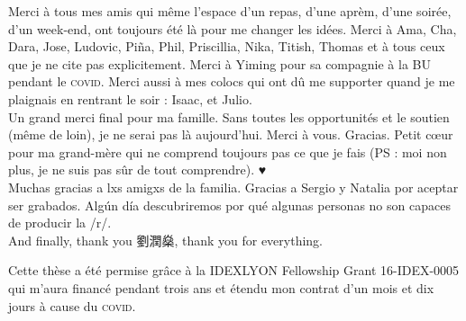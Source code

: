 Merci à tous mes amis qui même l'espace d'un repas, d'une aprèm, d'une soirée, d'un week-end, ont toujours été là pour me changer les idées. Merci à Ama, Cha, Dara, Jose, Ludovic, Piña, Phil, Priscillia, Nika, Titish, Thomas et à tous ceux que je ne cite pas explicitement.  Merci à Yiming pour sa compagnie à la BU pendant le \textsc{covid}. Merci aussi à mes colocs qui ont dû me supporter quand je me plaignais en rentrant le soir : Isaac, et Julio.\\

Un grand merci final pour ma famille. Sans toutes les opportunités et le soutien (même de loin), je ne serai pas là aujourd'hui. Merci à vous. Gracias. Petit cœur pour ma grand-mère qui ne comprend toujours pas ce que je fais (PS : moi non plus, je ne suis pas sûr de tout comprendre). ♥\\
Muchas gracias a lxs amigxs de la familia. Gracias a Sergio y Natalia por aceptar ser grabados. Algún día descubriremos por qué algunas personas no son capaces de producir la /r/.\\

\enlargethispage{2\baselineskip}
And finally, thank you {\cjkfont 劉潤燊}, thank you for everything.
\newpage

\hspace{0pt}
\vfill
\begin{flushright}
Cette thèse a été permise grâce à la IDEXLYON Fellowship Grant 16-IDEX-0005 qui m'aura financé pendant trois ans et étendu mon contrat d'un mois et dix jours à cause du \textsc{covid}.
\end{flushright}
\vfill
\hspace{0pt}